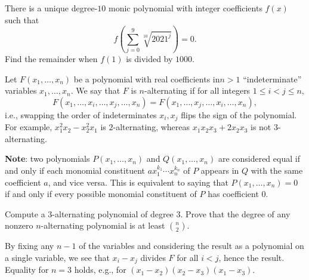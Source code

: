 \begin{question}[name={2021-22 CHMMC Winter, Team Round, \href{https://artofproblemsolving.com/community/c126h2825800p24986001}{Problem 6}}]
	There is a unique degree-$10$ monic polynomial with integer coefficients $f(x)$ such that
	$$f \left( \sum^9_{j=0}\sqrt[10]{2021^j}\right)= 0.$$ Find the remainder when $f(1)$ is divided by $1000$.
\end{question}




%	


\begin{question}[name={2021-22 CHMMC Winter, Proof Round, \href{https://artofproblemsolving.com/community/c126h2916225p26045386}{Problem 3}}]
	Let $F(x_1,\dots, x_n)$ be a polynomial with real coefficients in$ n > 1$ ``indeterminate'' variables $x_1,\dots, x_n$. We say that $F$ is $n$-alternating if for all integers $1 \le i < j \le n$,$$F(x_1,\dots, x_i,\dots, x_j,\dots, x_n) =F(x_1,\dots, x_j,\dots, x_i,\dots, x_n),$$i.e., swapping the order of indeterminates $x_i, x_j$ flips the sign of the polynomial. For example, $x^2_1x_2 - x^2_2x_1$ is $2$-alternating, whereas $x_1x_2x_3 +2x_2x_3$ is not $3$-alternating.
	
	\textbf{Note}: two polynomials $P(x_1,\dots, x_n)$ and $Q(x_1,\dots, x_n)$ are considered equal if and only if each monomial constituent $ax^{k_1}_1\cdots x^{k_n}_n$ of $P$ appears in $Q$ with the same coefficient $a$, and vice versa. This is equivalent to saying that $P(x_1,\dots, x_n) = 0$ if and only if every possible monomial constituent of $P$ has coefficient $0$.
	\begin{tasks}
		\task Compute a $3$-alternating polynomial of degree $3$.
		\task Prove that the degree of any nonzero $n$-alternating polynomial is at least ${n \choose 2}$.
	\end{tasks}
\end{question}

\begin{solution}[name={Solution by Assassino9931}]
	By fixing any $n-1$ of the variables and considering the result as a polynomial on a single variable, we see that $x_i - x_j$ divides $F$ for all $i < j$, hence the result. Equality for $n=3$ holds, e.g., for $(x_1 - x_2)(x_2 - x_3)(x_1 - x_3)$.
\end{solution}






